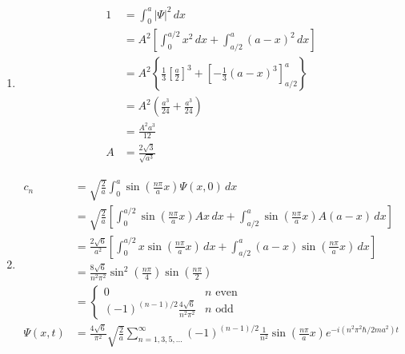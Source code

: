 \documentclass{article}
\begin{document}
\begin{enumerate}
  \item

        \begin{align*}
          1 & = \int_0^a |\Psi|^2 \,d x                                                                                         \\
            & = A^2 \left[ \int_0^{a / 2} x^2 \,d x + \int_{a / 2}^a (a - x)^2 \,d x \right]                                    \\
            & = A^2 \left\{ \frac{1}{3} \left[ \frac{a}{2} \right]^3 + \left[ -\frac{1}{3} (a - x)^3 \right]_{a / 2}^a \right\} \\
            & = A^2 \left( \frac{a^3}{24} + \frac{a^3}{24} \right)                                                              \\
            & = \frac{A^2 a^3}{12}                                                                                              \\
          A & = \frac{2 \sqrt{3}}{\sqrt{a^3}}
        \end{align*}

  \item

        \begin{align*}
          c_n        & = \sqrt{\frac{2}{a}} \int_0^a \sin \left( \frac{n \pi}{a} x \right) \Psi(x, 0) \,d x                                                                                                        \\
                     & = \sqrt{\frac{2}{a}} \left[ \int_0^{a / 2} \sin \left( \frac{n \pi}{a} x \right) A x \,d x + \int_{a / 2}^a \sin \left( \frac{n \pi}{a} x \right) A (a - x) \,d x \right]                   \\
                     & = \frac{2 \sqrt{6}}{a^2} \left[ \int_0^{a / 2} x \sin \left( \frac{n \pi}{a} x \right) \,d x + \int_{a / 2}^a (a - x) \sin \left( \frac{n \pi}{a} x \right) \,d x \right]                   \\
                     & = \frac{8 \sqrt{6}}{n^2 \pi^2} \sin^2 \left( \frac{n \pi}{4} \right) \sin \left( \frac{n \pi}{2} \right)                                                                                    \\
                     & = \begin{cases}
                           0                                               & n \text{ even} \\
                           (-1)^{(n - 1) / 2} \frac{4 \sqrt{6}}{n^2 \pi^2} & n \text{ odd}
                         \end{cases}                                                                                                           \\
          \Psi(x, t) & = \frac{4 \sqrt{6}}{\pi^2} \sqrt{\frac{2}{a}} \sum_{n = 1, 3, 5, \ldots}^\infty (-1)^{(n - 1) / 2} \frac{1}{n^2} \sin \left( \frac{n \pi}{a} x \right) e^{-i (n^2 \pi^2 \hbar / 2 m a^2) t} \\
        \end{align*}


\end{enumerate}
\end{document}
